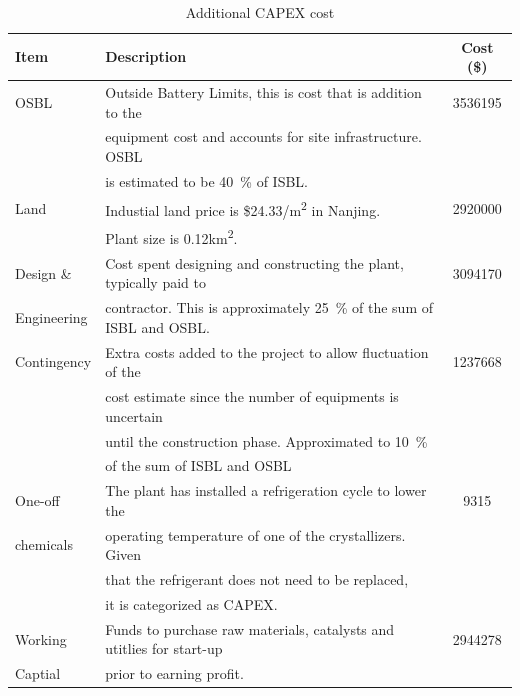 \begin{table}[H]
\centering
\caption{Additional CAPEX cost}
\label{tab:CAPEXadditional}
\begin{tabular}{llS[table-format=7.0]}
\toprule
\textbf{Item}        & \textbf{Description }                                                                      & \textbf{Cost (\$)}       \\\midrule
OSBL        & Outside Battery Limits, this is cost that is addition to the                      & 3536195 \\
            & equipment cost and accounts for site infrastructure. OSBL                         &           \\
            & is estimated to be \SI{40}{\percent} of ISBL.                                                  &           \\\midrule
Land        & Industial land price is \$24.33/m\textsuperscript{2} in Nanjing. & 2920000 \\
            & Plant size is 0.12km\textsuperscript{2}.                         &           \\\midrule
Design \&   & Cost spent designing and constructing the plant, typically paid to                & 3094170 \\
Engineering & contractor. This is approximately \SI{25}{\percent} of the sum of ISBL and OSBL.               &           \\\midrule
Contingency & Extra costs added to the project to allow fluctuation of the                      & 1237668 \\
            & cost estimate since the number of equipments is uncertain                         &           \\
            & until the construction phase. Approximated to \SI{10}{\percent}                             &           \\
            & of the sum of ISBL and OSBL                                                       &           \\\midrule
One-off     & The plant has installed a refrigeration cycle to lower the                        & 9315     \\
chemicals   & operating temperature of one of the crystallizers. Given                          &           \\
            & that the refrigerant does not need to be replaced,                                &           \\
            & it is categorized as CAPEX.                                                       &           \\\midrule
Working     & Funds to purchase raw materials, catalysts and utitlies for start-up              & 2944278 \\
Captial     & prior to earning profit.                                                                    &       \\\bottomrule   
\end{tabular}
\end{table}

